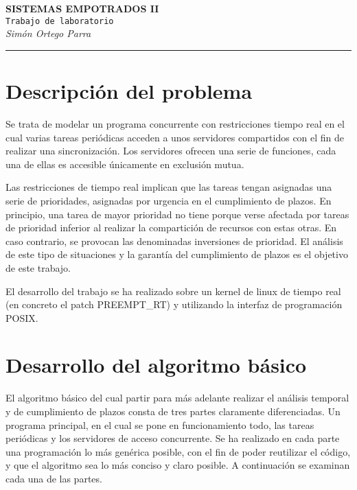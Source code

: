 \documentclass[11pt,spanish]{article}
\newcommand{\singlelinebreak}{\\[\baselineskip]}
\newcommand{\multiplelinebreak}[1]{\\[#1\baselineskip]}
\newcommand\docsubject{SISTEMAS EMPOTRADOS II}
\newcommand\doctitle{Trabajo de laboratorio}
\begin{document}
\noindent
{\huge\bf \docsubject}\multiplelinebreak{1.5}
{\huge\tt \doctitle}\singlelinebreak
{\Large\it Simón Ortego Parra}\\
\rule{\textwidth}{1.5pt}


\section{Descripción del problema}
Se trata de modelar un programa concurrente con restricciones tiempo real en el cual 
varias tareas periódicas acceden a unos servidores compartidos con el fin de realizar 
una sincronización. Los servidores ofrecen una serie de funciones, cada una de ellas 
es accesible únicamente en exclusión mutua.

Las restricciones de tiempo real implican que las tareas tengan asignadas una serie
de prioridades, asignadas por urgencia en el cumplimiento de plazos. En principio, una 
tarea de mayor prioridad no tiene porque verse afectada por tareas de prioridad inferior
al realizar la compartición de recursos con estas otras. En caso contrario, se provocan
las denominadas inversiones de prioridad. El análisis de este tipo de situaciones y 
la garantía del cumplimiento de plazos es el objetivo de este trabajo.

El desarrollo del trabajo se ha realizado sobre un kernel de linux de tiempo real (en
concreto el patch PREEMPT\_RT) y utilizando la interfaz de programación POSIX.

\section{Desarrollo del algoritmo básico}
El algoritmo básico del cual partir para más adelante realizar el análisis temporal y de
cumplimiento de plazos consta de tres partes claramente diferenciadas. Un programa
principal, en el cual se pone en funcionamiento todo, las tareas periódicas y los 
servidores de acceso concurrente. Se ha realizado en cada parte una programación lo más 
genérica posible, con el fin de poder reutilizar el código, y que el algoritmo sea lo más 
conciso y claro posible. A continuación se examinan cada una de las partes.
\end{document}
